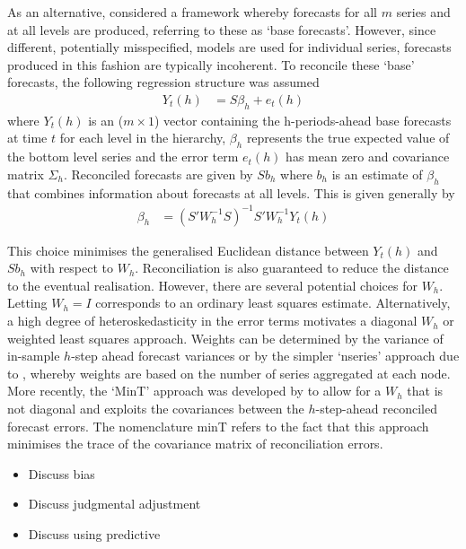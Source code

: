 \documentclass[a4paper,fleqn,11pt]{article}
\begin{document}
As an alternative, \cite{Hyndman2011} considered a framework whereby forecasts for all $m$ series and at all levels are produced, referring to these as `base forecasts'.  However, since different, potentially misspecified, models are used for individual series, forecasts produced in this fashion are typically incoherent. To reconcile these `base' forecasts, \cite{Hyndman2011} the following regression structure was assumed
\begin{align}
Y_t(h) &= S\beta_{h} + e_t(h)
\end{align}
where $Y_t(h)$ is an ($m \times 1$) vector containing the h-periods-ahead base forecasts at time $t$ for each level in the hierarchy, $\beta_{h}$ represents the true expected value of the bottom level series and the error term $e_t(h)$ has mean zero and covariance matrix $\Sigma_h$. Reconciled forecasts are given by $Sb_{h}$ where $b_h$ is an estimate of $\beta_{h}$ that combines information about forecasts at all levels.  This is given generally by
\begin{align}
\label{eq:reg}
\beta_{h} &= \left(S'W_h^{-1}S \right)^{-1} S'W_h^{-1}Y_t(h)
\end{align}

This choice minimises the generalised Euclidean distance between $Y_t(h)$ and $Sb_{h}$ with respect to $W_h$. Reconciliation is also guaranteed to reduce the distance to the eventual realisation.  However, there are several potential choices for $W_h$.  Letting $W_h=I$ corresponds to an ordinary least squares estimate.  Alternatively, a high degree of heteroskedasticity in the error terms motivates a diagonal $W_h$ or weighted least squares approach. Weights can be determined by the variance of in-sample $h$-step ahead forecast variances or by the simpler `nseries' approach due to \cite{Athanasopoulos2017}, whereby weights are based on the number of series aggregated at each node.  More recently, the `MinT' approach was developed by \cite{Wickramasuriya2015} to allow for a $W_h$ that is not diagonal and exploits the covariances between the $h$-step-ahead reconciled forecast errors. The nomenclature minT refers to the fact that this approach minimises the trace of the covariance matrix of reconciliation errors.  

\begin{itemize}
	\item Discuss bias
	\item Discuss judgmental adjustment 
	\item Discuss using predictive
\end{itemize}
\end{document}
